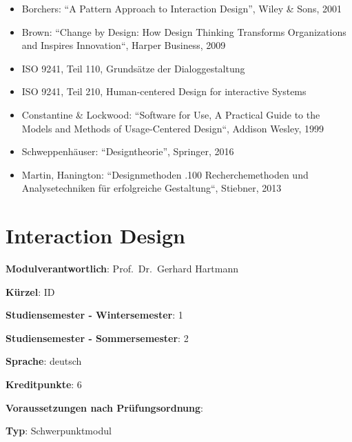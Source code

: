 \begin{itemize}
\tightlist
\item
  Borchers: ``A Pattern Approach to Interaction Design'', Wiley \& Sons,
  2001
\item
  Brown: ``Change by Design: How Design Thinking Transforms
  Organizations and Inspires Innovation``, Harper Business, 2009
\item
  ISO 9241, Teil 110, Grundsätze der Dialoggestaltung
\item
  ISO 9241, Teil 210, Human-centered Design for interactive Systems
\item
  Constantine \& Lockwood: ``Software for Use, A Practical Guide to the
  Models and Methods of Usage-Centered Design``, Addison Wesley, 1999
\item
  Schweppenhäuser: ``Designtheorie'', Springer, 2016
\item
  Martin, Hanington: ``Designmethoden .100 Recherchemethoden und
  Analysetechniken für erfolgreiche Gestaltung``, Stiebner, 2013
\end{itemize}

\chapter{Interaction Design}\label{interaction-design}

\begin{modulHead}
\textbf{Modulverantwortlich}: Prof.~Dr.~Gerhard
Hartmann
\end{modulHead}
\begin{modulHead}
\textbf{Kürzel}:
ID
\end{modulHead}
\begin{modulHead}
\textbf{Studiensemester -
Wintersemester}:
1
\end{modulHead}
\begin{modulHead}
\textbf{Studiensemester -
Sommersemester}: 2
\end{modulHead}
\begin{modulHead}
\textbf{Sprache}:
deutsch
\end{modulHead}
\begin{modulHead}
\textbf{Kreditpunkte}:
6
\end{modulHead}
\begin{modulHead}
\textbf{Voraussetzungen nach
Prüfungsordnung}: 
\end{modulHead}
\begin{modulHead}
\textbf{Typ}:
Schwerpunktmodul
\end{modulHead}


